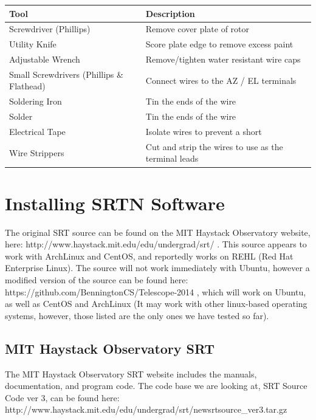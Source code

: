 \documentclass[11pt]{article} %
\begin{document}
\begin{tabular}{| l | l |}
\hline
\textbf{Tool} & \textbf{Description} \\ \hline \hline
Screwdriver (Phillips) & Remove cover plate of rotor \\ \hline
Utility Knife & Score plate edge to remove excess paint \\ \hline
Adjustable Wrench & Remove/tighten water resistant wire caps \\ \hline
Small Screwdrivers (Phillips \& Flathead) & Connect wires to the AZ / EL terminals \\ \hline
Soldering Iron & Tin the ends of the wire \\ \hline
Solder & Tin the ends of the wire \\ \hline
Electrical Tape & Isolate wires to prevent a short \\ \hline
Wire Strippers & Cut and strip the wires to use as the terminal leads \\ \hline
\end{tabular}



\newpage
\section{Installing SRTN Software}

The original SRT source can be found on the MIT Haystack Observatory website, here: http://www.haystack.mit.edu/edu/undergrad/srt/ . This source appears to work with ArchLinux and CentOS, and reportedly works on REHL (Red Hat Enterprise Linux). The source will not work immediately with Ubuntu, however a modified version of the source can be found here: https://github.com/BenningtonCS/Telescope-2014 , which will work on Ubuntu, as well as CentOS and ArchLinux (It may work with other linux-based operating systems, however, those listed are the only ones we have tested so far). 
\vspace{1cm}
\subsection{MIT Haystack Observatory SRT}
The MIT Haystack Observatory SRT website includes the manuals, documentation, and program code. The code base we are looking at, SRT Source Code ver 3, can be found here: \\ http://www.haystack.mit.edu/edu/undergrad/srt/newsrtsource\_ver3.tar.gz
\end{document}

